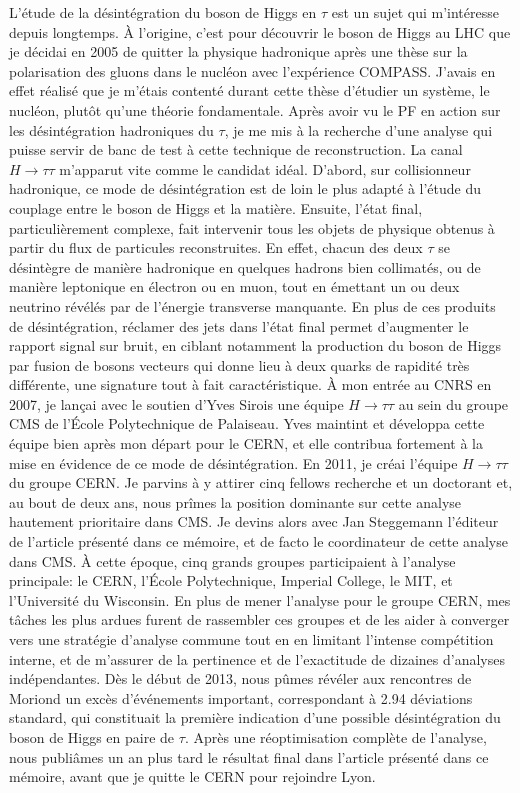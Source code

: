 L'étude de la désintégration du boson de Higgs en $\tau$ est un sujet qui m'intéresse depuis longtemps. 
À l'origine, c'est pour découvrir le boson de Higgs au LHC que je décidai en 2005 de quitter la physique hadronique après une thèse sur la polarisation des gluons dans le nucléon avec l'expérience COMPASS.
J'avais en effet réalisé que je m'étais contenté durant cette thèse d'étudier un système, le nucléon, plutôt qu'une théorie fondamentale. 
Après avoir vu le PF en action sur les désintégration hadroniques du $\tau$, 
je me mis à la recherche d'une analyse qui puisse servir de banc de test à cette technique de reconstruction. 
La canal $H \to \tau \tau$ m'apparut vite comme le candidat idéal. 
D'abord, sur collisionneur hadronique, ce mode de désintégration est de loin le plus adapté à l'étude du couplage entre le boson de Higgs et la matière. 
Ensuite, l'état final, particulièrement complexe, fait intervenir tous les objets de physique obtenus à partir du flux de particules reconstruites.
En effet, chacun des deux $\tau$ se désintègre de manière hadronique en quelques hadrons bien collimatés, 
ou de manière leptonique en électron ou en muon, tout en émettant un ou deux neutrino révélés par de l'énergie transverse manquante. 
En plus de ces produits de désintégration, réclamer des jets dans l'état final permet d'augmenter le rapport signal sur bruit, en ciblant notamment la production du boson de Higgs par fusion de bosons vecteurs qui donne lieu à deux quarks de rapidité très différente, une signature tout à fait caractéristique. 
À mon entrée au CNRS en 2007, je lançai avec le soutien d'Yves Sirois une équipe $H \to \tau \tau$ au sein du groupe CMS de l'École Polytechnique de Palaiseau. 
Yves maintint et développa cette équipe bien après mon départ pour le CERN, et elle contribua fortement à la mise en évidence de ce mode de désintégration. 
En 2011, je créai l'équipe $H \to \tau \tau$ du groupe CERN. 
Je parvins à y attirer cinq fellows recherche et un doctorant et, au bout de deux ans, nous prîmes la position dominante sur cette analyse hautement prioritaire dans CMS.
Je devins alors avec Jan Steggemann l'éditeur de l'article présenté dans ce mémoire, 
et de facto le coordinateur de cette analyse dans CMS. 
À cette époque, cinq grands groupes participaient à l'analyse principale: le CERN, l'École Polytechnique, Imperial College, le MIT, et l'Université du Wisconsin.
En plus de mener l'analyse pour le groupe CERN, mes tâches les plus ardues furent de rassembler ces groupes et de les aider à converger vers une stratégie d'analyse commune tout en en limitant l'intense compétition interne, 
et de m'assurer de la pertinence et de l'exactitude de dizaines d'analyses indépendantes.
Dès le début de 2013, nous pûmes révéler aux rencontres de Moriond 
un excès d'événements important, correspondant à 2.94 déviations standard, qui constituait la première indication d'une possible désintégration du boson de Higgs en paire de $\tau$. 
Après une réoptimisation complète de l'analyse, nous publiâmes un an plus tard le résultat final dans l'article présenté dans ce mémoire, avant que je quitte le CERN pour rejoindre Lyon.  

